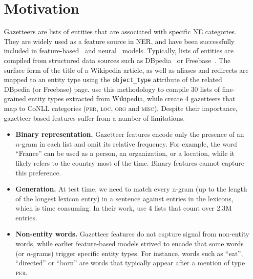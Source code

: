 \documentclass[11pt]{article}
\newcommand{\per}{\textsc{per}}
\newcommand{\loc}{\textsc{loc}}
\newcommand{\org}{\textsc{org}}
\newcommand{\misc}{\textsc{misc}}
\begin{document}
\section{Motivation}
	\label{sec:motivation}
	
	Gazetteers are lists of entities that are associated with specific NE categories. They are widely used as a feature source in NER, and have been successfully included in  feature-based~\cite{ratinov2009design} and neural~\cite{chiu2015named} models. Typically, lists of entities are compiled from structured data sources such as DBpedia~\cite{auer2007dbpedia} or Freebase~\cite{Bollacker:2008}. The surface form of the title of a Wikipedia article, as well as aliases and redirects are mapped to an entity type using the \texttt{object\_type} attribute of the related DBpedia (or Freebase) page.  use this methodology to compile 30 lists of fine-grained entity types extracted from Wikipedia, while  create 4 gazetteers that map to CoNLL categories (\per, \loc, \org{} and \misc). Despite their importance, gazetteer-based features suffer from a number of limitations.
	
	
	\begin{itemize}
		
		\item \textbf{Binary representation.} Gazetteer features encode only the presence of an $n$-gram in each list and omit its relative frequency. For example, the word \enquote{France} can be used as a person, an organization, or a location, while it likely refers to the country most of the time. Binary features cannot capture this preference. 
		
		\item \textbf{Generation.} At test time, we need to match every n-gram (up to the length of the longest lexicon entry) in a sentence against entries in the lexicons, which is time consuming. In their work,  use 4 lists that count over 2.3M entries.
		
\item \textbf{Non-entity words.}	Gazetteer features do not capture signal from non-entity words, while earlier feature-based models strived to encode  that some words (or $n$-grams) trigger specific entity types.  For instance, words such as \enquote{eat}, \enquote{directed} or \enquote{born} are words that typically appear after a mention of type \per.
		
	\end{itemize}
	
\end{document}
